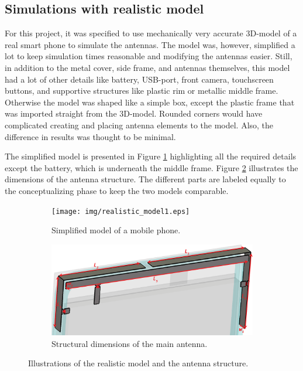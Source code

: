 \subsection{Simulations with realistic model}
\label{sec:sim_realistic}
For this project, it was specified to use mechanically very accurate 3D-model of a real smart phone to simulate the antennas. The model was, however, simplified a lot to keep simulation times reasonable and modifying the antennas easier. Still, in addition to the metal cover, side frame, and antennas themselves, this model had a lot of other details like battery, USB-port, front camera, touchscreen buttons, and supportive structures like plastic rim or metallic middle frame. Otherwise the model was shaped like a simple box, except the plastic frame that was imported straight from the 3D-model. Rounded corners would have complicated creating and placing antenna elements to the model. Also, the difference in results was thought to be minimal. 

The simplified model is presented in Figure \ref{fig:realistic_model1} highlighting all the required details except the battery, which is underneath the middle frame. Figure \ref{fig:realistic_model2} illustrates the dimensions of the antenna structure. The different parts are labeled equally to the conceptualizing phase to keep the two models comparable.
\begin{figure}[H]
    \centering
    \begin{subfigure}[b]{0.5\textwidth}
        \texttt{[image: img/realistic\_model1.eps]}
        \caption{Simplified model of a mobile phone.}
        \label{fig:realistic_model1}
    \end{subfigure}
    
    \begin{subfigure}[b]{0.5\textwidth}
        \includegraphics[width=\textwidth]{img/realistic_model2.eps}
        \caption{Structural dimensions of the main antenna.}
        \label{fig:realistic_model2}
    \end{subfigure}
    \caption{Illustrations of the realistic model and the antenna structure.}
    \label{fig:realistic_model}
\end{figure}

